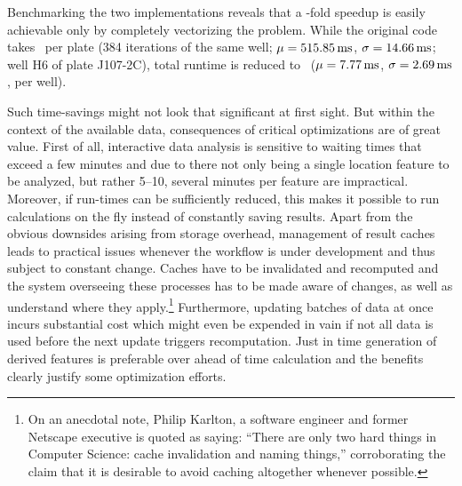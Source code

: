 
Benchmarking the two implementations reveals that a \knitrScfBenchmarkSpeedup -fold speedup is easily achievable only by completely vectorizing the problem. While the original code takes \knitrScfBenchmarkEdgeTotal\ per plate (384 iterations of the same well; $\mu=\SI{515.85}{\milli\second}$, $\sigma=\SI{14.66}{\milli\second}$; well H6 of plate J107-2C), total runtime is reduced to \knitrScfBenchmarkFacetTotal\ ($\mu=\SI{7.77}{\milli\second}$, $\sigma=\SI{2.69}{\milli\second}$, per well).

Such time-savings might not look that significant at first sight. But within the context of the available data, consequences of critical optimizations are of great value. First of all, interactive data analysis is sensitive to waiting times that exceed a few minutes and due to there not only being a single location feature to be analyzed, but rather 5--10, several minutes per feature are impractical. Moreover, if run-times can be sufficiently reduced, this makes it possible to run calculations on the fly instead of constantly saving results. Apart from the obvious downsides arising from storage overhead, management of result caches leads to practical issues whenever the workflow is under development and thus subject to constant change. Caches have to be invalidated and recomputed and the system overseeing these processes has to be made aware of changes, as well as understand where they apply.\footnote{On an anecdotal note, Philip Karlton, a software engineer and former Netscape executive is quoted as saying: ``There are only two hard things in Computer Science: cache invalidation and naming things,'' corroborating the claim that it is desirable to avoid caching altogether whenever possible.} Furthermore, updating batches of data at once incurs substantial cost which might even be expended in vain if not all data is used before the next update triggers recomputation. Just in time generation of derived features is preferable over ahead of time calculation and the benefits clearly justify some optimization efforts.


